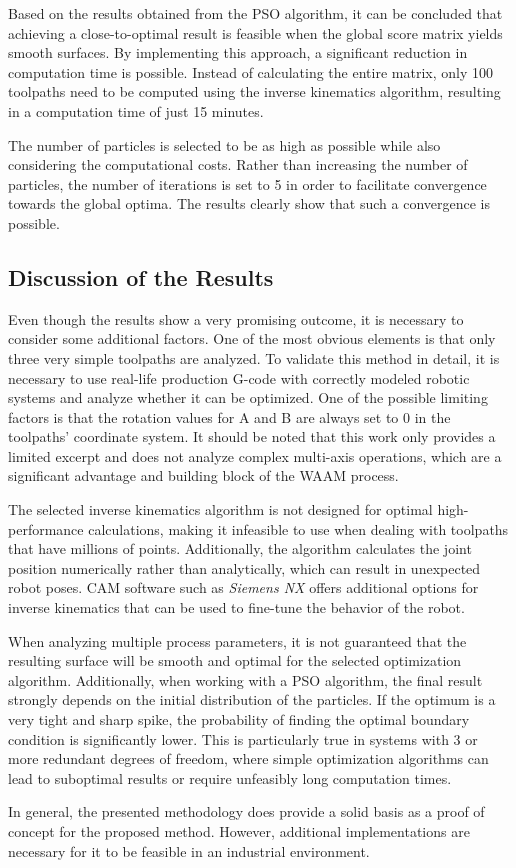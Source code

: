 Based on the results obtained from the PSO algorithm, it can be concluded that achieving a close-to-optimal result is feasible when the global score matrix yields smooth surfaces. By implementing this approach, a significant reduction in computation time is possible. Instead of calculating the entire matrix, only 100 toolpaths need to be computed using the inverse kinematics algorithm, resulting in a computation time of just 15 minutes.

The number of particles is selected to be as high as possible while also considering the computational costs. Rather than increasing the number of particles, the number of iterations is set to 5 in order to facilitate convergence towards the global optima.
The results clearly show that such a convergence is possible.



 




\newpage
\subsection{Discussion of the Results}%
Even though the results show a very promising outcome, it is necessary to consider some additional factors. One of the most obvious elements is that only three very simple toolpaths are analyzed. To validate this method in detail, it is necessary to use real-life production G-code with correctly modeled robotic systems and analyze whether it can be optimized. One of the possible limiting factors is that the rotation values for A and B are always set to 0 in the toolpaths' coordinate system. It should be noted that this work only provides a limited excerpt and does not analyze complex multi-axis operations, which are a significant advantage and building block of the WAAM process.

The selected inverse kinematics algorithm is not designed for optimal high-performance calculations, making it infeasible to use when dealing with toolpaths that have millions of points. Additionally, the algorithm calculates the joint position numerically rather than analytically, which can result in unexpected robot poses. CAM software such as \textit{Siemens NX} offers additional options for inverse kinematics that can be used to fine-tune the behavior of the robot.

When analyzing multiple process parameters, it is not guaranteed that the resulting surface will be smooth and optimal for the selected optimization algorithm. Additionally, when working with a PSO algorithm, the final result strongly depends on the initial distribution of the particles. If the optimum is a very tight and sharp spike, the probability of finding the optimal boundary condition is significantly lower. This is particularly true in systems with 3 or more redundant degrees of freedom, where simple optimization algorithms can lead to suboptimal results or require unfeasibly long computation times.

In general, the presented methodology does provide a solid basis as a proof of concept for the proposed method. However, additional implementations are necessary for it to be feasible in an industrial environment.
